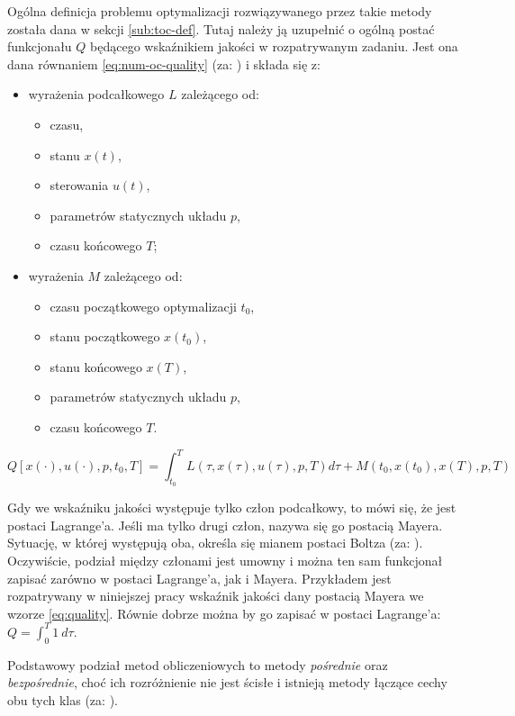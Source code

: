 Ogólna definicja problemu optymalizacji rozwiązywanego przez takie metody została dana w sekcji \ref{sub:toc-def}. Tutaj należy ją uzupełnić o ogólną postać funkcjonału $Q$ będącego wskaźnikiem jakości w rozpatrywanym zadaniu. Jest ona dana równaniem \ref{eq:num-oc-quality} (za: \cite{Rao2010}) i składa się z:
\begin{itemize}
    \item wyrażenia podcałkowego $L$ zależącego od:
    \begin{itemize}
        \item czasu,
        \item stanu $x(t)$,
        \item sterowania $u(t)$,
        \item parametrów statycznych układu $p$,
        \item czasu końcowego $T$;
    \end{itemize}
    \item wyrażenia $M$ zależącego od:
    \begin{itemize}
        \item czasu początkowego optymalizacji $t_{0}$,
        \item stanu początkowego $x(t_{0})$,
        \item stanu końcowego $x(T)$,
        \item parametrów statycznych układu $p$,
        \item czasu końcowego $T$.
    \end{itemize}
\end{itemize}

\begin{equation}\label{eq:num-oc-quality}
Q[x(\cdot), u(\cdot), p, t_{0}, T] = \int_{t_{0}}^{T}L(\tau, x(\tau), u(\tau), p, T)d\tau + M(t_{0}, x(t_{0}), x(T), p, T)
\end{equation}

Gdy we wskaźniku jakości występuje tylko człon podcałkowy, to mówi się, że jest postaci Lagrange'a. Jeśli ma tylko drugi człon, nazywa się go postacią Mayera. Sytuację, w której występują oba, określa się mianem postaci Boltza (za: \cite{Rao2010}). Oczywiście, podział między członami jest umowny i można ten sam funkcjonał zapisać zarówno w postaci Lagrange'a, jak i Mayera. Przykładem jest rozpatrywany w niniejszej pracy wskaźnik jakości dany postacią Mayera we wzorze \ref{eq:quality}. Równie dobrze można by go zapisać w postaci Lagrange'a: $Q = \int_{0}^{T} 1 ~d\tau$.

Podstawowy podział metod obliczeniowych to metody \emph{pośrednie} oraz \emph{bezpośrednie}, choć ich rozróżnienie nie jest ścisłe i istnieją metody łączące cechy obu tych klas (za: \cite{Betts98}).

